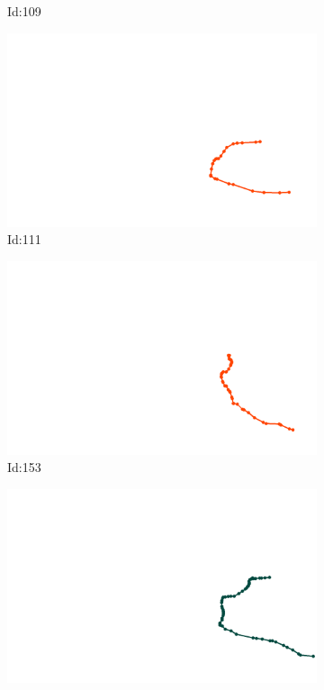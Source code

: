 \documentclass[12pt,twoside]{report}
\begin{document}
\begin{figure}
\begin{subfigure}[b]{0.20\textwidth}
\caption{Id:109}
\end{subfigure}
\begin{subfigure}[b]{0.20\textwidth}
\centering
\includegraphics[width=\textwidth]{../trajectories/111.png}
\caption{Id:111}
\end{subfigure}
\begin{subfigure}[b]{0.20\textwidth}
\centering
\includegraphics[width=\textwidth]{../trajectories/153.png}
\caption{Id:153}
\end{subfigure}
\begin{subfigure}[b]{0.20\textwidth}
\centering
\includegraphics[width=\textwidth]{../trajectories/157.png}

\end{subfigure}
\end{figure}
\end{document}
